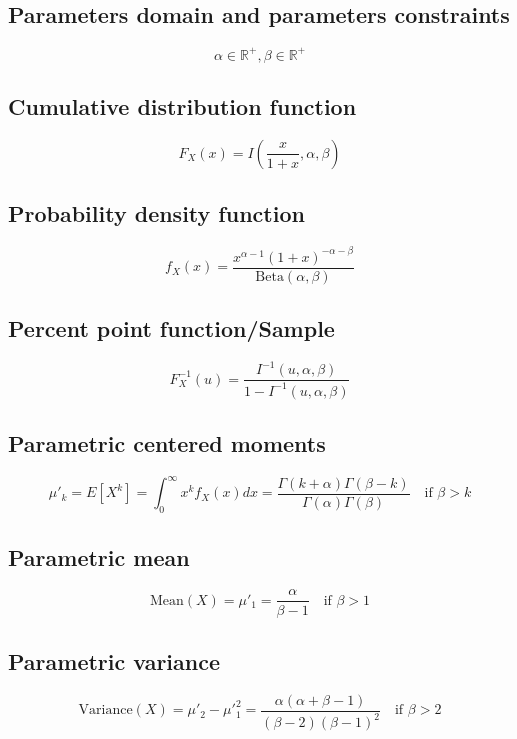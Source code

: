 \documentclass{article}
\begin{document}
\subsection{Parameters domain and parameters constraints}
\begin{equation*} \alpha\in\mathbb{R}^{+}, \beta\in\mathbb{R}^{+} \end{equation*}
\subsection{Cumulative distribution function}
\begin{equation*} F_{X}\left(x\right)=I\left(\frac{x}{1+x},\alpha,\beta\right) \end{equation*}
\subsection{Probability density function}
\begin{equation*} f_{X}\left(x\right)=\frac{x^{\alpha-1} (1+x)^{-\alpha -\beta}}{\text{Beta}(\alpha,\beta)} \end{equation*}
\subsection{Percent point function/Sample}
\begin{equation*} F^{-1}_{X}\left(u\right)=\frac{I^{-1}\left(u,\alpha,\beta\right)}{1-I^{-1}\left(u,\alpha,\beta\right)} \end{equation*}
\subsection{Parametric centered moments}
\begin{equation*} \mu'_{k}=E[X^k]=\int_{0}^{\infty}x^{k}f_{X}\left(x\right)dx=\frac{\Gamma\left(k+\alpha\right)\Gamma\left(\beta-k\right)}{\Gamma\left(\alpha\right)\Gamma\left(\beta\right)} \quad \text{if }\beta>k \end{equation*}
\subsection{Parametric mean}
\begin{equation*} \mathrm{Mean}(X)=\mu'_{1}=\frac{\alpha}{\beta-1} \quad \text{if }\beta>1 \end{equation*}
\subsection{Parametric variance}
\begin{equation*} \mathrm{Variance}(X)=\mu'_{2}-\mu'^{2}_{1}=\frac{\alpha(\alpha+\beta-1)}{(\beta-2)(\beta-1)^2} \quad \text{if }\beta>2 \end{equation*}
\end{document}
